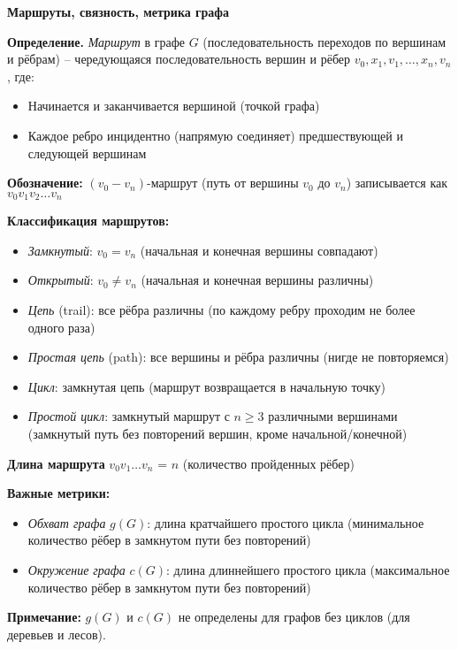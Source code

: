 \textbf{Маршруты, связность, метрика графа}

\noindent\textbf{Определение.} \textit{Маршрут} в графе $G$ (последовательность переходов по вершинам и рёбрам) -- чередующаяся последовательность вершин и рёбер $v_0, x_1, v_1, \ldots, x_n, v_n$, где:
\begin{itemize}
\item Начинается и заканчивается вершиной (точкой графа)
\item Каждое ребро инцидентно (напрямую соединяет) предшествующей и следующей вершинам
\end{itemize}

\noindent\textbf{Обозначение:} $(v_0-v_n)$-маршрут (путь от вершины $v_0$ до $v_n$) записывается как $v_0 v_1 v_2 \ldots v_n$

\noindent\textbf{Классификация маршрутов:}
\begin{itemize}
\item \textit{Замкнутый}: $v_0 = v_n$ (начальная и конечная вершины совпадают)
\item \textit{Открытый}: $v_0 \neq v_n$ (начальная и конечная вершины различны)
\item \textit{Цепь} (trail): все рёбра различны (по каждому ребру проходим не более одного раза)
\item \textit{Простая цепь} (path): все вершины и рёбра различны (нигде не повторяемся)
\item \textit{Цикл}: замкнутая цепь (маршрут возвращается в начальную точку)
\item \textit{Простой цикл}: замкнутый маршрут с $n \geq 3$ различными вершинами (замкнутый путь без повторений вершин, кроме начальной/конечной)
\end{itemize}

\noindent\textbf{Длина маршрута} $v_0 v_1 \ldots v_n$ = $n$ (количество пройденных рёбер)

\noindent\textbf{Важные метрики:}
\begin{itemize}
\item \textit{Обхват графа} $g(G)$: длина кратчайшего простого цикла (минимальное количество рёбер в замкнутом пути без повторений)
\item \textit{Окружение графа} $c(G)$: длина длиннейшего простого цикла (максимальное количество рёбер в замкнутом пути без повторений)
\end{itemize}

\noindent\textbf{Примечание:} $g(G)$ и $c(G)$ не определены для графов без циклов (для деревьев и лесов).